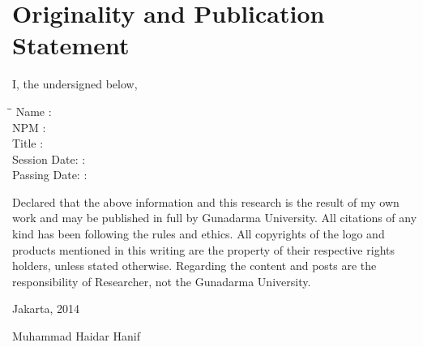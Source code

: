 
\begingroup
\let\clearpage\relax
\let\cleardoublepage\relax

\chapter{Originality and Publication Statement}
\label{chap:sig-statement}

I, the undersigned below,

\begin{tabbing}
\hspace*{3cm}\=\hspace*{0.5cm}\= \kill
Name \>:\> \myName \\
NPM \>:\> \myNPM \\
Title \>:\> \myDepTitle \\
Session Date: \>:\> \myDateSession \\
Passing Date: \>:\> \myDatePassing
\end{tabbing}

Declared that the above information and this research is the result of my own work and may be published in full by Gunadarma University. All citations of any kind has been following the rules and ethics. All copyrights of the logo and products mentioned in this writing are the property of their respective rights holders, unless stated otherwise. Regarding the content and posts are the responsibility of Researcher, not the Gunadarma University.

\hfill

\noindent Jakarta, 2014

\hfill

\noindent Muhammad Haidar Hanif

\endgroup

